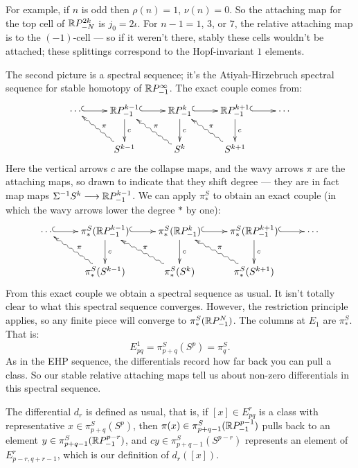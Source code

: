 For example, if $n$ is odd then $\rho(n) = 1$, $\nu(n) = 0$.  So the attaching map for the top cell of $\mathbb{R} P^{2k}_{-N}$ is $j_0 = 2\iota$.  For $n-1 = 1$, $3$, or $7$, the relative attaching map is to the $(-1)$-cell --- so if it weren't there, stably these cells wouldn't be attached; these splittings correspond to the Hopf-invariant $1$ elements.

The second picture is a spectral sequence; it's the Atiyah-Hirzebruch spectral sequence for stable homotopy of $\mathbb{R} P^\infty_{-1}$.  The exact couple comes from:
\[\xymatrix{
\cdots\ar@{^{(}->}[r]&\RP^{k-1}_{-1}\ar@{^{(}->}[r]\ar[d]^{c}&\RP^{k}_{-1}\ar@{^{(}->}[r]\ar[d]^{c}&\RP^{k+1}_{-1}\ar@{^{(}->}[r]\ar[d]^{c}&\cdots\\
&S^{k-1}\ar@{~>}[ul]_\pi&S^k\ar@{~>}[ul]_\pi&S^{k+1}\ar@{~>}[ul]_\pi
}\]
Here the vertical arrows $c$ are the collapse maps,
and the wavy arrows $\pi$ are the attaching maps, so drawn to indicate that they shift degree --- they are in fact map maps $\Sigma^{-1}S^k\longrightarrow\mathbb{R} P^{k-1}_{-1}$. We can apply $\pi_*^S$ to obtain an exact couple (in which the wavy arrows lower the degree $*$ by one):
\[\xymatrix{
\cdots\ar@{^{(}->}[r]&\pi_*^S(\RP^{k-1}_{-1})\ar@{^{(}->}[r]\ar[d]^{c}&\pi_*^S(\RP^{k}_{-1})\ar@{^{(}->}[r]\ar[d]^{c}&\pi_*^S(\RP^{k+1}_{-1})\ar@{^{(}->}[r]\ar[d]^{c}&\cdots\\
&\pi_*^S(S^{k-1})\ar@{~>}[ul]_\pi&\pi_*^S(S^k)\ar@{~>}[ul]_\pi&\pi_*^S(S^{k+1})\ar@{~>}[ul]_\pi
}\]
From this exact couple we obtain a spectral sequence as usual. It isn't totally clear to what this spectral sequence converges.  However, the restriction principle applies, so any finite piece will converge to $\pi_*^S (\mathbb{R} P^N_{-1})$. The columns at $E_1$ are $\pi_*^S$. That is:
\[E^1_{pq}=\pi^S_{p+q}(S^p)=\pi^S_q.\]
As in the EHP sequence, the differentials record how far back you can pull a class.  So our stable relative attaching maps tell us about non-zero differentials in this spectral sequence.

The differential $d_r$ is defined as usual, that is, if $[x]\in E_{pq}^r$ is a class with representative $x\in\pi^S_{p+q}(S^p)$, then $\pi(x)\in\pi^S_{p+q-1}(\mathbb{R} P^{p-1}_{-1})$ pulls back to an element $y\in \pi^S_{p+q-1}(\mathbb{R} P^{p-r}_{-1})$, and $cy\in \pi^S_{p+q-1}(S^{p-r})$ represents an element of $E_{p-r,q+r-1}^r$, which is our definition of $d_r([x])$.

